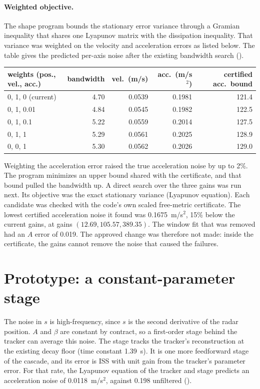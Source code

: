 \documentclass[11pt]{article}
\begin{document}
\paragraph{Weighted objective.} The shape program bounds the stationary
error variance through a Gramian inequality that shares one Lyapunov
matrix with the dissipation inequality. That variance was weighted on the
velocity and acceleration errors as listed below. The table gives the
predicted per-axis noise after the existing bandwidth search
().
\begin{center}
\begin{tabular}{lrrrr}
\toprule
weights (pos., vel., acc.) & bandwidth & vel.\ (m/s) & acc.\ (m/s$^2$) & certified acc.\ bound\\
\midrule
0, 1, 0 (current) & 4.70 & 0.0539 & 0.1981 & 121.4\\
0, 1, 0.01 & 4.84 & 0.0545 & 0.1982 & 122.5\\
0, 1, 0.1 & 5.22 & 0.0559 & 0.2014 & 127.5\\
0, 1, 1 & 5.29 & 0.0561 & 0.2025 & 128.9\\
0, 0, 1 & 5.30 & 0.0562 & 0.2026 & 129.0\\
\bottomrule
\end{tabular}
\end{center}
Weighting the acceleration error raised the true acceleration noise by up to
2\%. The program minimizes an upper bound shared with the certificate, and
that bound pulled the bandwidth up. A direct search over the three gains was
run next. Its objective was the exact stationary variance (Lyapunov
equation). Each candidate was checked with the code's own scaled
free-metric certificate. The lowest certified acceleration noise it found
was 0.1675~m/s$^2$, 15\% below the current gains, at gains $(12.69, 105.57,
389.35)$. The window fit that was removed had an $A$ error of 0.019. The
approved change was therefore not made: inside the certificate, the gains
cannot remove the noise that caused the failures.

\section{Prototype: a constant-parameter stage}
The noise in $s$ is high-frequency, since $s$ is the second derivative of the
radar position. $A$ and $\beta$ are constant by contract, so a first-order
stage behind the tracker can average this noise. The stage tracks the
tracker's reconstruction at the existing decay floor (time constant 1.39~s).
It is one more feedforward stage of the cascade, and its error is ISS with
unit gain from the tracker's parameter error. For that rate, the Lyapunov
equation of the tracker and stage predicts an acceleration noise of
0.0118~m/s$^2$, against 0.198 unfiltered
().
\end{document}
